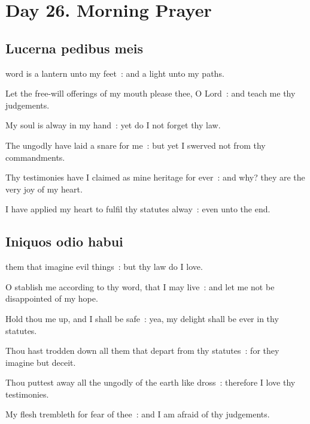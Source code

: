 \clearpage
\section*{Day 26. Morning Prayer}


\subsection{Lucerna pedibus meis}


 word is a lantern unto my feet~: and a light unto my paths.\par
{}
Let the free-will offerings of my mouth please thee, O Lord~: and teach me thy judgements.\par
{}My soul is alway in my hand~: yet do I not forget thy law.\par
{}The ungodly have laid a snare for me~: but yet I swerved not from thy commandments.\par
{}Thy testimonies have I claimed as mine heritage for ever~: and why? they are the very joy of my heart.\par
{}I have applied my heart to fulfil thy statutes alway~: even unto the end.\par

\subsection{Iniquos odio habui}


 them that imagine evil things~: but thy law do I love.\par
{}
O stablish me according to thy word, that I may live~: and let me not be disappointed of my hope.\par
{}Hold thou me up, and I shall be safe~: yea, my delight shall be ever in thy statutes.\par
{}Thou hast trodden down all them that depart from thy statutes~: for they imagine but deceit.\par
{}Thou puttest away all the ungodly of the earth like dross~: therefore I love thy testimonies.\par
{}My flesh trembleth for fear of thee~: and I am afraid of thy judgements.\par


